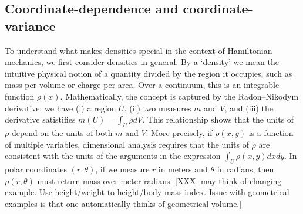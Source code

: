 \documentclass[letterpaper]{article}
\begin{document}

\subsection{Coordinate-dependence and coordinate-variance}
\label{dependence}


To understand what makes densities special in the context of Hamiltonian mechanics, we first consider densities in general. By a `density' we mean the intuitive physical notion of a quantity divided by the region it occupies, such as mass per volume or charge per area. Over a continuum, this is an integrable function $\rho(x)$. Mathematically, the concept is captured by the Radon–Nikodym derivative: we have (i) a region $U$, (ii) two measures $m$ and $V$, and (iii) the derivative satistifies $m(U) = \int_U \rho dV$. This relationship shows that the units of $\rho$ depend on the units of both $m$ and $V$. More precisely, if $\rho(x, y)$ is a function of multiple variables, dimensional analysis requires that the units of $\rho$ are consistent with the units of the arguments in the expression $\int_U \rho(x, y) dx dy$. In polar coordinates $(r, \theta)$, if we measure $r$ in meters and $\theta$ in radians, then $\rho(r, \theta)$ must return mass over meter-radians. [XXX: may think of changing example. Use height/weight to height/body mass index. Issue with geometrical examples is that one automatically thinks of geometrical volume.]
\end{document}
